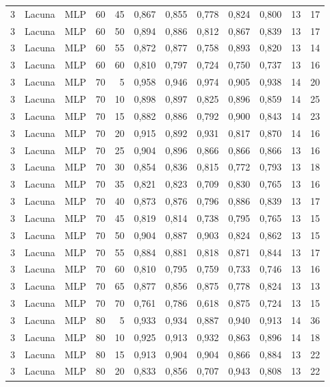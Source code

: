 \begin{longtable}{@{}rllrrrrrrrrr@{}}
3 & Lacuna & MLP & 60 & 45 & 0,867 & 0,855 & 0,778 & 0,824 & 0,800 & 13 & 17 \\
3 & Lacuna & MLP & 60 & 50 & 0,894 & 0,886 & 0,812 & 0,867 & 0,839 & 13 & 17 \\
3 & Lacuna & MLP & 60 & 55 & 0,872 & 0,877 & 0,758 & 0,893 & 0,820 & 13 & 14 \\
3 & Lacuna & MLP & 60 & 60 & 0,810 & 0,797 & 0,724 & 0,750 & 0,737 & 13 & 16 \\
3 & Lacuna & MLP & 70 & 5 & 0,958 & 0,946 & 0,974 & 0,905 & 0,938 & 14 & 20 \\
3 & Lacuna & MLP & 70 & 10 & 0,898 & 0,897 & 0,825 & 0,896 & 0,859 & 14 & 25 \\
3 & Lacuna & MLP & 70 & 15 & 0,882 & 0,886 & 0,792 & 0,900 & 0,843 & 14 & 23 \\
3 & Lacuna & MLP & 70 & 20 & 0,915 & 0,892 & 0,931 & 0,817 & 0,870 & 14 & 16 \\
3 & Lacuna & MLP & 70 & 25 & 0,904 & 0,896 & 0,866 & 0,866 & 0,866 & 13 & 16 \\
3 & Lacuna & MLP & 70 & 30 & 0,854 & 0,836 & 0,815 & 0,772 & 0,793 & 13 & 18 \\
3 & Lacuna & MLP & 70 & 35 & 0,821 & 0,823 & 0,709 & 0,830 & 0,765 & 13 & 16 \\
3 & Lacuna & MLP & 70 & 40 & 0,873 & 0,876 & 0,796 & 0,886 & 0,839 & 13 & 17 \\
3 & Lacuna & MLP & 70 & 45 & 0,819 & 0,814 & 0,738 & 0,795 & 0,765 & 13 & 15 \\
3 & Lacuna & MLP & 70 & 50 & 0,904 & 0,887 & 0,903 & 0,824 & 0,862 & 13 & 15 \\
3 & Lacuna & MLP & 70 & 55 & 0,884 & 0,881 & 0,818 & 0,871 & 0,844 & 13 & 17 \\
3 & Lacuna & MLP & 70 & 60 & 0,810 & 0,795 & 0,759 & 0,733 & 0,746 & 13 & 16 \\
3 & Lacuna & MLP & 70 & 65 & 0,877 & 0,856 & 0,875 & 0,778 & 0,824 & 13 & 13 \\
3 & Lacuna & MLP & 70 & 70 & 0,761 & 0,786 & 0,618 & 0,875 & 0,724 & 13 & 15 \\
3 & Lacuna & MLP & 80 & 5 & 0,933 & 0,934 & 0,887 & 0,940 & 0,913 & 14 & 36 \\
3 & Lacuna & MLP & 80 & 10 & 0,925 & 0,913 & 0,932 & 0,863 & 0,896 & 14 & 18 \\
3 & Lacuna & MLP & 80 & 15 & 0,913 & 0,904 & 0,904 & 0,866 & 0,884 & 13 & 22 \\
3 & Lacuna & MLP & 80 & 20 & 0,833 & 0,856 & 0,707 & 0,943 & 0,808 & 13 & 22 \\

\end{longtable}
